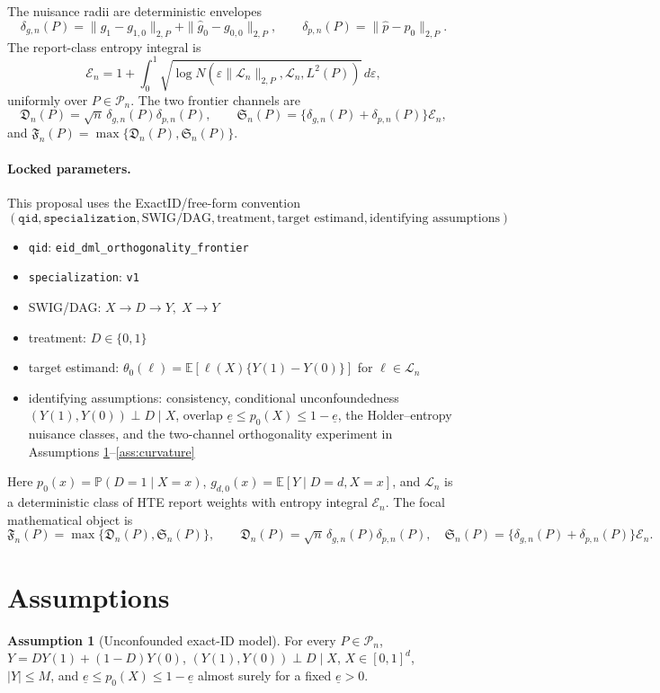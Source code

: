 \documentclass[11pt]{article}
\newcommand{\E}{\mathbb{E}}
\renewcommand{\Pr}{\mathbb{P}}
\theoremstyle{definition}
\newtheorem{assumption}{Assumption}
\theoremstyle{plain}
\theoremstyle{remark}
\begin{document}
The nuisance radii are deterministic envelopes
\[
\delta_{g,n}(P)=\|\hat g_1-g_{1,0}\|_{2,P}+\|\hat g_0-g_{0,0}\|_{2,P},\qquad
\delta_{p,n}(P)=\|\hat p-p_0\|_{2,P}.
\]
The report-class entropy integral is
\[
\mathcal{E}_n
=1+\int_0^1
\sqrt{\log N(\varepsilon\|\mathcal{L}_n\|_{2,P},\mathcal{L}_n,L^2(P))}
\,d\varepsilon,
\]
uniformly over \(P\in\mathcal{P}_n\).  The two frontier channels are
\[
\mathfrak{D}_n(P)=\sqrt n\,\delta_{g,n}(P)\delta_{p,n}(P),\qquad
\mathfrak{S}_n(P)=\{\delta_{g,n}(P)+\delta_{p,n}(P)\}\mathcal{E}_n,
\]
and \(\mathfrak{F}_n(P)=\max\{\mathfrak{D}_n(P),\mathfrak{S}_n(P)\}\).

\paragraph{Locked parameters.}
This proposal uses the ExactID/free-form convention
\[
(\texttt{qid},\texttt{specialization},\text{SWIG/DAG},\text{treatment},
\text{target estimand},\text{identifying assumptions}).
\]
\begin{itemize}
\item \texttt{qid}: \texttt{eid\_dml\_orthogonality\_frontier}
\item \texttt{specialization}: \texttt{v1}
\item SWIG/DAG: \(X\to D\to Y,\; X\to Y\)
\item treatment: \(D\in\{0,1\}\)
\item target estimand: \(\theta_0(\ell)=\E[\ell(X)\{Y(1)-Y(0)\}]\)
for \(\ell\in\mathcal{L}_n\)
\item identifying assumptions: consistency, conditional unconfoundedness
\((Y(1),Y(0))\perp D\mid X\), overlap
\(\underline e\le p_0(X)\le 1-\underline e\), the Holder--entropy nuisance
classes, and the two-channel orthogonality experiment in Assumptions
\ref{ass:unconfounded}--\ref{ass:curvature}
\end{itemize}
Here \(p_0(x)=\Pr(D=1\mid X=x)\), \(g_{d,0}(x)=\E[Y\mid D=d,X=x]\), and
\(\mathcal{L}_n\) is a deterministic class of HTE report weights with entropy
integral \(\mathcal{E}_n\).  The focal mathematical object is
\[
\mathfrak{F}_n(P)=
\max\{\mathfrak{D}_n(P),\mathfrak{S}_n(P)\},\qquad
\mathfrak{D}_n(P)=\sqrt n\,\delta_{g,n}(P)\delta_{p,n}(P),\quad
\mathfrak{S}_n(P)=\{\delta_{g,n}(P)+\delta_{p,n}(P)\}\mathcal{E}_n.
\]

\section{Assumptions}
\begin{assumption}[Unconfounded exact-ID model]\label{ass:unconfounded}
For every \(P\in\mathcal{P}_n\), \(Y=DY(1)+(1-D)Y(0)\),
\((Y(1),Y(0))\perp D\mid X\), \(X\in[0,1]^d\), \(|Y|\le M\), and
\(\underline e\le p_0(X)\le1-\underline e\) almost surely for a fixed
\(\underline e>0\).
\end{assumption}
\end{document}
